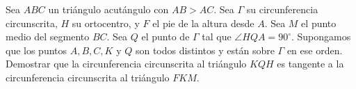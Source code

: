 Sea $ABC$ un triángulo acutángulo con $AB\gt AC$. Sea $\Gamma$ su circunferencia circunscrita, $H$ su ortocentro, y $F$ el pie de la altura desde $A$. Sea $M$ el punto medio del segmento $BC$. Sea $Q$ el punto de $\Gamma$ tal que $\angle HQA = 90^{\circ}$. Supongamos que los puntos $A,B,C,K$ y $Q$ son todos distintos y están sobre $\Gamma$ en ese orden. \newline 
Demostrar que la circunferencia circunscrita al triángulo $KQH$ es tangente a la circunferencia circunscrita al triángulo $FKM$.